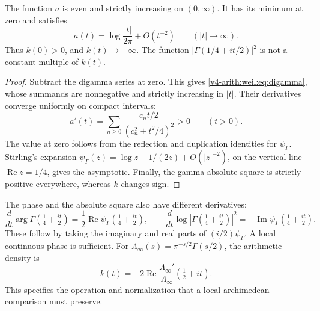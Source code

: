 \begin{proposition}
\label{v4-arith:weil:prop:gamma-signs}
The function \(a\) is even and strictly increasing on \((0,\infty)\).
It has its minimum at zero and satisfies
\[
 a(t)=\log\frac{|t|}{2\pi}+O(t^{-2})
                  \qquad(|t|\to\infty).
\]
Thus \(k(0)>0\), and \(k(t)\to-\infty\).
The function \(|\Gamma(1/4+it/2)|^2\) is not a constant multiple of
\(k(t)\).
\end{proposition}
\begin{proof}
Subtract the digamma series at zero. This gives
\eqref{v4-arith:weil:eq:digamma}, whose summands are nonnegative and
strictly increasing in \(|t|\). Their derivatives converge uniformly
on compact intervals:
\[
 a'(t)=\sum_{n\ge0}
       \frac{c_nt/2}{(c_n^2+t^2/4)^2}>0\qquad(t>0).
\]
The value at zero follows from the reflection and duplication identities
for \(\psi_\Gamma\). Stirling's expansion
\(\psi_\Gamma(z)=\log z-1/(2z)+O(|z|^{-2})\), on the vertical line
\(\operatorname{Re}z=1/4\), gives the asymptotic.
Finally, the gamma absolute square is strictly positive everywhere,
whereas \(k\) changes sign.
\end{proof}

The phase and the absolute square also have different derivatives:
\begin{equation}
 \frac{d}{dt}\arg\Gamma(\tfrac14+\tfrac{it}{2})
       =\frac12\operatorname{Re}\psi_\Gamma(\tfrac14+\tfrac{it}{2}),
 \qquad
 \frac{d}{dt}\log|\Gamma(\tfrac14+\tfrac{it}{2})|^2
       =-\operatorname{Im}\psi_\Gamma(\tfrac14+\tfrac{it}{2}).
 \label{v4-arith:weil:eq:gamma-derivatives}
\end{equation}
These follow by taking the imaginary and real parts of
\((i/2)\psi_\Gamma\). A local continuous phase is sufficient.
For \(\Lambda_\infty(s)=\pi^{-s/2}\Gamma(s/2)\), the arithmetic
density is
\[
 k(t)=-2\operatorname{Re}
      \frac{\Lambda_\infty'}{\Lambda_\infty}(\tfrac12+it).
\]
This specifies the operation and normalization that a local
archimedean comparison must preserve.

